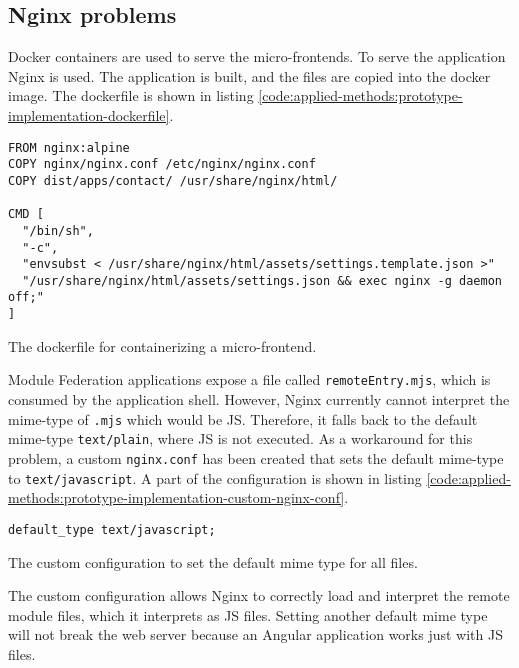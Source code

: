 \subsection{Nginx problems}\label{subsection:applied-methods:prototypical-implementation:nginx-problems}

Docker containers are used to serve the micro-frontends. To serve the application Nginx is used. The application is built, and the files are copied into the docker image. The dockerfile is shown in listing \ref{code:applied-methods:prototype-implementation-dockerfile}.

\ifshowListings
  \begin{listing}[H]
  \begin{verbatim}
FROM nginx:alpine
COPY nginx/nginx.conf /etc/nginx/nginx.conf
COPY dist/apps/contact/ /usr/share/nginx/html/
    
CMD [
  "/bin/sh", 
  "-c", 
  "envsubst < /usr/share/nginx/html/assets/settings.template.json >" 
  "/usr/share/nginx/html/assets/settings.json && exec nginx -g daemon off;"
]
  \end{verbatim}
  \caption{The dockerfile for containerizing a micro-frontend.}\label{code:applied-methods:prototype-implementation-dockerfile}
  \end{listing}
\fi

\noindent Module Federation applications expose a file called \texttt{remoteEntry.mjs}, which is consumed by the application shell. However, Nginx currently cannot interpret the mime-type of \texttt{\*.mjs} which would be \ac{JS}. Therefore, it falls back to the default mime-type \texttt{text/plain}, where \ac{JS} is not executed. As a workaround for this problem, a custom \texttt{nginx.conf} has been created that sets the default mime-type to \texttt{text/javascript}. A part of the configuration is shown in listing \ref{code:applied-methods:prototype-implementation-custom-nginx-conf}.

\ifshowListings
  \begin{listing}[H]
  \begin{verbatim}
default_type text/javascript;
  \end{verbatim}
  \caption{The custom configuration to set the default mime type for all files.}\label{code:applied-methods:prototype-implementation-custom-nginx-conf}
  \end{listing}
\fi

\noindent The custom configuration allows Nginx to correctly load and interpret the remote module files, which it interprets as \ac{JS} files. Setting another default mime type will not break the web server because an Angular application works just with \ac{JS} files.
